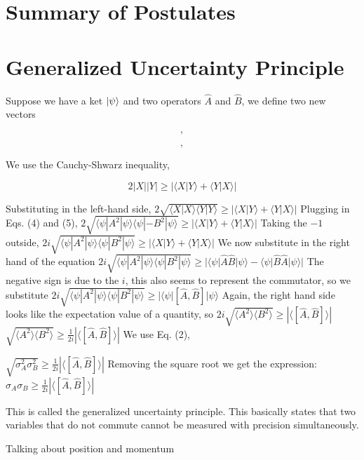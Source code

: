 \section{Summary of Postulates}
\section{Generalized Uncertainty Principle}
Suppose we have a ket $\ket{\psi}$ and two operators $\hat{A}$ and $\hat{B}$, we define two new vectors

$$,$$

$$,$$

We use the Cauchy-Shwarz inequality,

$$ 2|X||Y| \geq |\langle X|Y \rangle + \langle Y|X \rangle |$$

Substituting in the left-hand side,
$2\sqrt{\langle X|X\rangle\langle Y|Y\rangle} \geq |\langle X| Y  \rangle+ \langle Y | X \rangle|$
Plugging in Eqs. (4) and (5),
$2\sqrt{\langle \psi |A^{2} |\psi \rangle \langle \psi | -B^{2}| \psi \rangle} \geq |\langle X | Y \rangle + \langle Y | X \rangle |$
Taking the $-1$ outside,
$2i\sqrt{\langle \psi |A^{2} |\psi \rangle \langle \psi | B^{2}| \psi \rangle} \geq |\langle X | Y \rangle + \langle Y | X \rangle|$
We now substitute in the right hand of the equation
$2i\sqrt{\langle \psi |A^{2} |\psi \rangle \langle \psi | B^{2}| \psi \rangle} \geq | \langle {\psi} |\hat{A}\hat{B}| {\psi} \rangle - \langle {\psi} |\hat{B}\hat{A}| {\psi} \rangle|$
The negative sign is due to the $i$, this also seems to represent the commutator, so we substitute
$2i\sqrt{\langle \psi |A^{2} |\psi \rangle \langle \psi | B^{2}| \psi \rangle }\geq |\langle\psi |[\hat{A},\hat{B}]|\psi\rangle$
Again, the right hand side looks like the expectation value of a quantity, so
$2i\sqrt{\langle A^{2} \rangle \langle B^{2} \rangle} \geq |\langle [\hat{A},\hat{B}] \rangle |$
$\sqrt{\langle A^{2} \rangle \langle B^{2} \rangle} \geq \frac{1}{2i} |\langle [\hat{A},\hat{B}] \rangle |$
We use Eq. (2),

$\sqrt{\sigma_{A}^{2}\sigma_{B}^{2}} \geq \frac{1}{2i} |\langle [\hat{A},\hat{B}] \rangle|$
Removing the square root we get the expression:
$\sigma_{A}\sigma_{B} \geq \frac{1}{2i} |\langle[\hat{A}, \hat{B}]\rangle|$

This is called the generalized uncertainty principle. This basically states that two variables that do not commute cannot be measured with precision simultaneously.

Talking about position and momentum

